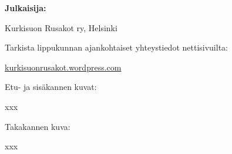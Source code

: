 \documentclass[10pt,finnish,a5paper]{scrartcl}
\begin{document}
\medskip

\noindent\textbf{Julkaisija:}

Kurkisuon Rusakot ry, Helsinki

\medskip

\noindent Tarkista lippukunnan ajankohtaiset yhteystiedot nettisivuilta:

\href{https://kurkisuonrusakot.wordpress.com/}{kurkisuonrusakot.wordpress.com}

\medskip

\noindent Etu- ja sisäkannen kuvat:

xxx

\noindent Takakannen kuva:

xxx

\vspace{0.64cm}

\tableofcontents
















% 



\clearpage

\thispagestyle{empty}

\vfill
\end{document}
